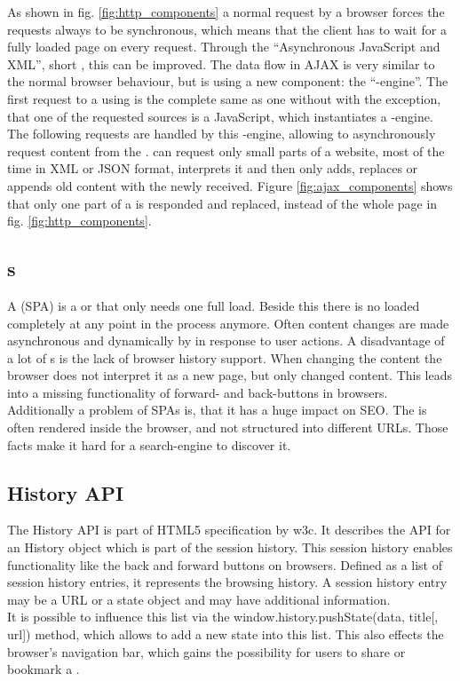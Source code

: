 \noindent{}As shown in fig. \ref{fig:http_components} a normal \http{} request by a browser forces the requests always to be synchronous, which means that the client has to wait for a fully loaded page on every request.
Through the \enquote{Asynchronous JavaScript and XML}, short \ajax{}, this can be improved.
The data flow in AJAX is very similar to the normal browser behaviour, but is using a new component: the \enquote{\ajax{}-engine}.
The first request to a \webServer{} using \ajax{} is the complete same as one without \ajax{} with the exception, that one of the requested sources is a JavaScript, which instantiates a \ajax{}-engine.
The following requests are handled by this \ajax{}-engine, allowing to asynchronously request content from the \webServer{}.
\ajax{} can request only small parts of a website, most of the time in XML or JSON format, interprets it and then only adds, replaces or appends old content with the newly received.
Figure \ref{fig:ajax_components} shows that only one part of a \webPage{} is responded and replaced, instead of the whole page in fig. \ref{fig:http_components}.

\subsection{\SinglePageApplication{}s\label{singlePageApplication}}
A \singlePageApplication{} (SPA) is a \webApplication{} or \webSite{} that only needs one full \webPage{} load.
Beside this there is no \webPage{} loaded completely at any point in the process anymore.
Often content changes are made asynchronous and dynamically by \ajax{} in response to user actions.
A disadvantage of a lot of \singlePageApplication{}s is the lack of browser history support.
When changing the content the browser does not interpret it as a new page, but only changed content.
This leads into a missing functionality of forward- and back-buttons in browsers.
\\
Additionally a problem of SPAs is, that it has a huge impact on SEO.
The \webPage{} is often rendered inside the browser, and not structured into different URLs.
Those facts make it hard for a search-engine to discover it.

\subsection{History API}
The History API is part of HTML5 specification by \gls{w3c}.
It describes the API for an History object which is part of the session history.
This session history enables functionality like the back and forward buttons on browsers.
Defined as a list of session history entries, it represents the browsing history.
A session history entry may be a URL or a state object and may have additional information.
\\
It is possible to influence this list via the window.history.pushState(data, title[, url]) method, which allows to add a new state into this list.
This also effects the browser's navigation bar, which gains the possibility for users to share or bookmark a \webPage{}.
\\